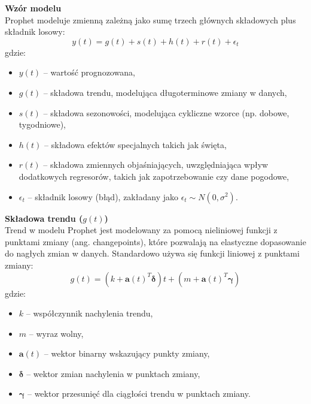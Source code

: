 \textbf{Wzór modelu} \\
Prophet modeluje zmienną zależną jako sumę trzech głównych składowych plus składnik losowy:
\begin{equation}
y(t) = g(t) + s(t) + h(t) + r(t) + \epsilon_t
\end{equation}
gdzie:
\begin{itemize}
    \item \( y(t) \) -- wartość prognozowana,
    \item \( g(t) \) -- składowa trendu, modelująca długoterminowe zmiany w danych,
    \item \( s(t) \) -- składowa sezonowości, modelująca cykliczne wzorce (np. dobowe, tygodniowe),
    \item \( h(t) \) -- składowa efektów specjalnych takich jak święta,
    \item \( r(t) \) -- składowa zmiennych objaśniających, uwzględniająca wpływ dodatkowych regresorów, takich jak zapotrzebowanie czy dane pogodowe,
    \item \( \epsilon_t \) -- składnik losowy (błąd), zakładany jako \( \epsilon_t \sim N(0, \sigma^2) \).
\end{itemize}

\textbf{Składowa trendu (\( g(t) \))} \\
Trend w modelu Prophet jest modelowany za pomocą nieliniowej funkcji z punktami zmiany (ang. changepoints), które pozwalają na elastyczne dopasowanie do nagłych zmian w danych. Standardowo używa się funkcji liniowej z punktami zmiany:
\begin{equation}
g(t) = (k + \mathbf{a}(t)^T \boldsymbol{\delta}) t + (m + \mathbf{a}(t)^T \boldsymbol{\gamma})
\end{equation}
gdzie:
\begin{itemize}
    \item \( k \) -- współczynnik nachylenia trendu,
    \item \( m \) -- wyraz wolny,
    \item \( \mathbf{a}(t) \) -- wektor binarny wskazujący punkty zmiany,
    \item \( \boldsymbol{\delta} \) -- wektor zmian nachylenia w punktach zmiany,
    \item \( \boldsymbol{\gamma} \) -- wektor przesunięć dla ciągłości trendu w punktach zmiany.
\end{itemize}

